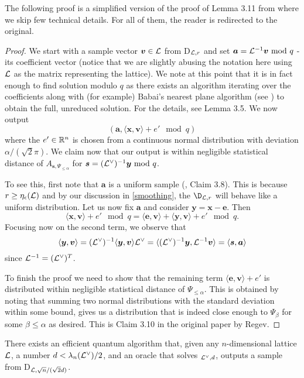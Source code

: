 The following proof is a simplified version of the proof of Lemma 3.11 from \cite{regev} where we skip few technical details. For all of them, the reader is redirected to the original.
\begin{proof}
	We start with a sample vector $\boldsymbol{v} \in \mathcal{L}$ from D$_{\mathcal{L}, r}$ and set $\boldsymbol{a} = \mathcal{L}^{-1} \boldsymbol{v} \text{ mod } q$ - its coefficient vector (notice that we are slightly abusing the notation here using $\mathcal{L}$ as the matrix representing the lattice). We note at this point that it is in fact enough to find solution modulo $q$ as there exists an algorithm iterating over the coefficients along with (for example) Babai's nearest plane algorithm (see \cite{babai}) to obtain the full, unreduced solution. For the details, see \cite{regev} Lemma 3.5. We now output
	\begin{equation} (\bm{a}, \langle \bm{x}, \bm{v} \rangle + e' \mod q) \end{equation}
	where the $e' \in \mathbb{R}^n$ is chosen from a continuous normal distribution with deviation $\alpha/(\sqrt{2} \pi)$. We claim now that our output is within negligible statistical distance of $A_{\bm{s}, \Psi_{\leq \alpha}}$ for $\boldsymbol{s} = (\mathcal{L}^{\vee})^{-1}\boldsymbol{y} \text{ mod } q$.

	To see this, first note that $\bm{a}$ is a uniform sample (\cite{regev}, Claim 3.8). This is because $r \geq \eta_{\epsilon}(\mathcal{L})$ and by our discussion in \ref{smoothing}, the $\D_{\Ll, r}$ will behave like a uniform distribution. Let us now fix $\bm{a}$ and consider $\bm{y} = \bm{x} - \bm{e}$. Then
	\[ \langle \bm{x}, \bm{v} \rangle + e' \mod q = \langle \bm{e}, \bm{v} \rangle + \langle \bm{y}, \bm{v} \rangle + e' \mod q. \]
Focusing now on the second term, we observe that
\[ \langle \boldsymbol{y}, \boldsymbol{v} \rangle = (\mathcal{L}^{\vee})^{-1} \langle \boldsymbol{y}, \boldsymbol{v} \rangle \mathcal{L}^{\vee} =  \langle (\mathcal{L}^{\vee})^{-1}\boldsymbol{y}, \mathcal{L}^{-1} \boldsymbol{v} \rangle = \langle \boldsymbol{s}, \boldsymbol{a} \rangle \]
since $\mathcal{L}^{-1} = (\mathcal{L}^{\vee})^T$.

To finish the proof we need to show that the remaining term $\langle \bm{e}, \bm{v} \rangle + e'$ is distributed within negligible statistical distance of $\Psi_{\leq \alpha}$. This is obtained by noting that summing two normal distributions with the standard deviation within some bound, gives us a distribution that is indeed close enough to $\Psi_{\beta}$ for some $\beta \leq \alpha$ as desired. This is Claim 3.10 in the original paper by Regev.
\end{proof}
\begin{proposition}\label{quantum}
	There exists an efficient quantum algorithm that, given any $n$-dimensional lattice $\mathcal{L}$, a number $d < \lambda_n (\mathcal{L}^{\vee})/2$, and an oracle that solves $_{\mathcal{L}^{\vee},d}$, outputs a sample from D$_{\mathcal{L},\sqrt{n}/(\sqrt{2}d)}$.
\end{proposition}


